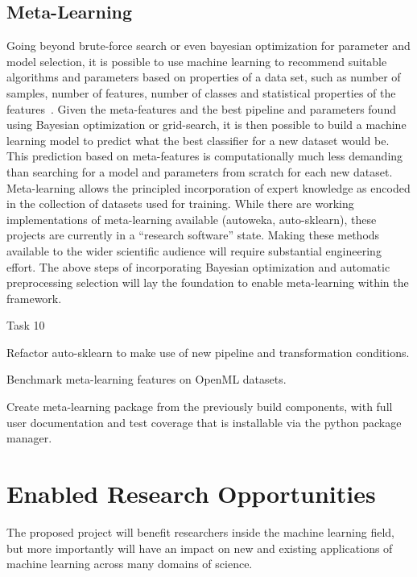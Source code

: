 \subsection{Meta-Learning}
Going beyond brute-force search or even bayesian optimization for parameter and
model selection, it is possible to use machine learning to recommend suitable
algorithms and parameters based on properties of a data set, such as number of
samples, number of features, number of classes and statistical properties of
the features~\autocite{luo2015review, feurer-nips2015}.
Given the meta-features and the best pipeline and parameters found using
Bayesian optimization or grid-search, it is then possible to build a machine
learning model to predict what the best classifier for a new dataset would be.
This prediction based on meta-features is computationally much less demanding
than searching for a model and parameters from scratch for each new dataset.
Meta-learning allows the principled incorporation of expert knowledge as encoded
in the collection of datasets used for training.
While there are working implementations of meta-learning available (autoweka, auto-sklearn),
these projects are currently in a ``research software'' state. Making these methods
available to the wider scientific audience will require substantial engineering
effort. The above steps of incorporating Bayesian optimization and automatic
preprocessing selection will lay the foundation to enable meta-learning within the
\sklearn{} framework.
\begin{labeling}{Task 10}
    \item [Task 10] Refactor auto-sklearn to make use of new pipeline and transformation conditions.
    \item [Task 11] Benchmark meta-learning features on OpenML datasets.
    \item [Task 12] Create meta-learning package from the previously build
        components, with full user documentation and test coverage that is
        installable via the python package manager.
\end{labeling}

\section{Enabled Research Opportunities}
The proposed project will benefit researchers inside the machine learning field,
but more importantly will have an impact on new and existing applications of machine
learning across many domains of science.

